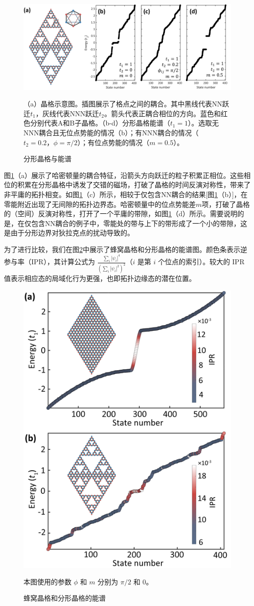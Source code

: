 \begin{figure}[htbp]
    \centering
    \includegraphics[width=0.75\linewidth]{figure/FracHaldTheo/FractalSpectrum.png}
    \caption{分形晶格与能谱}（a）晶格示意图。插图展示了格点之间的耦合。其中黑线代表NN跃迁$t_1$，灰线代表NNN跃迁$t_2$。箭头代表正耦合相位的方向。蓝色和红色分别代表A和B子晶格。（b-d）分形晶格能谱（$t_1=1$）。选取无NNN耦合且无位点势能的情况（b）；有NNN耦合的情况（$t_2=0.2，\phi=\pi/2$）；有位点势能的情况（$m=0.5$）。
    \label{fig:FractalSpectrum}
\end{figure}

图\ref{fig:FractalSpectrum}（a）展示了哈密顿量的耦合特征，沿箭头方向跃迁的粒子积累正相位。这些相位的积累在分形晶格中诱发了交错的磁场，打破了晶格的时间反演对称性，带来了非平庸的拓扑相变。如图\ref{fig:FractalSpectrum}（c）所示，相较于仅包含NN耦合的结果[图\ref{fig:FractalSpectrum}（b）]，在零能附近出现了无间隙的拓扑边界态。哈密顿量中的位点势能差\( m \)项，打破了晶格的（空间）反演对称性，打开了一个平庸的带隙，如图\ref{fig:FractalSpectrum}（d）所示。需要说明的是，在仅包含NN耦合的例子中，零能处的带与上下的带形成了一个小的带隙，这是由于分形边界对狄拉克点的扰动导致的。

为了进行比较，我们在图\ref{fig:HaldSPec}中展示了蜂窝晶格和分形晶格的能谱图。颜色条表示逆参与率（IPR），其计算公式为 \(\frac{\sum_i |\psi_i|^4}{\left(\sum_i |\psi_i|^2\right)^2}\)（\(i\) 是第 \(i\) 个位点的索引）。较大的 IPR 值表示相应态的局域化行为更强，也即拓扑边缘态的潜在位置。

\begin{figure}[htbp]
    \centering
    \includegraphics[width=0.45\linewidth]{figure//FracHaldTheo/HaldSPec.png}
    \caption{蜂窝晶格和分形晶格的能谱}本图使用的参数 $\phi$ 和 $m$ 分别为 $\pi/2$ 和 $0$。
    \label{fig:HaldSPec}
\end{figure}

